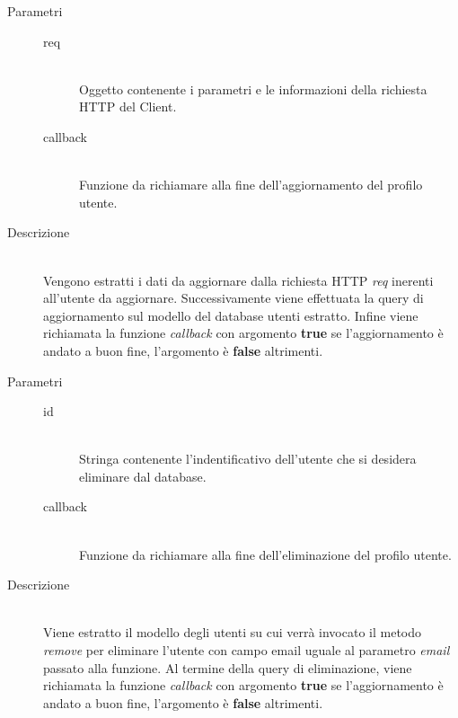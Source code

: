 \begin{description}
\begin{mldescription}
 		 \hfill
 			\begin{description}
 				\item[Parametri] \hfill
 					\begin{description}
 						\item[req] \hfill \\
 							Oggetto contenente i parametri e le informazioni della richiesta HTTP del Client.
 						\item[callback] \hfill \\
 							Funzione da richiamare alla fine dell'aggiornamento del profilo utente.
 					\end{description}
 				\item[Descrizione] \hfill \\
 				Vengono estratti i dati da aggiornare dalla richiesta HTTP \textit{req} inerenti all'utente da aggiornare. Successivamente viene effettuata la query di aggiornamento sul modello del database utenti estratto. Infine viene richiamata la funzione \textit{callback} con argomento \textbf{true} se l'aggiornamento è andato a buon fine, l'argomento è \textbf{false} altrimenti.
 			\end{description}
 			
 		 \hfill
 			\begin{description}
 				\item[Parametri] \hfill
 					\begin{description}
 						\item[id] \hfill \\
 							Stringa contenente l'indentificativo dell'utente che si desidera eliminare dal database.
 						\item[callback] \hfill \\
 							Funzione da richiamare alla fine dell'eliminazione del profilo utente.
 					\end{description}
 				\item[Descrizione] \hfill \\
 				Viene estratto il modello degli utenti su cui verrà invocato il metodo \textit{remove} per eliminare l'utente con campo email uguale al parametro \textit{email} passato alla funzione. Al termine della query di eliminazione, viene richiamata la funzione \textit{callback} con argomento \textbf{true} se l'aggiornamento è andato a buon fine, l'argomento è \textbf{false} altrimenti.
 			\end{description}
 			
 	\end{mldescription}
\end{description}


